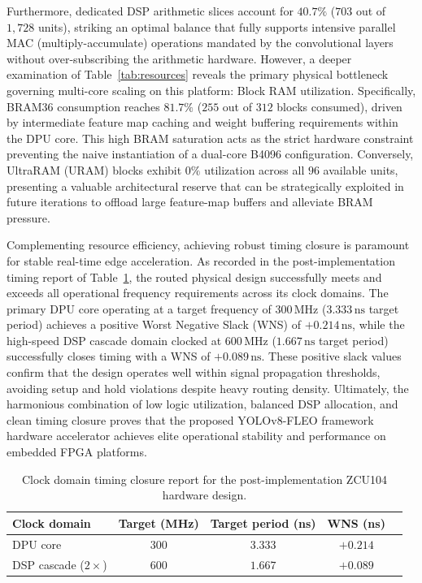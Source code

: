 \documentclass[algorithms,article,submit,moreauthors]{Definitions/mdpi}
\begin{document}
Furthermore, dedicated DSP arithmetic slices account for $40.7\%$ ($703$ out of $1{,}728$ units), striking an optimal balance that fully supports intensive parallel MAC (multiply-accumulate) operations mandated by the convolutional layers without over-subscribing the arithmetic hardware. However, a deeper examination of Table~\ref{tab:resources} reveals the primary physical bottleneck governing multi-core scaling on this platform: Block RAM utilization. Specifically, BRAM36 consumption reaches $81.7\%$ ($255$ out of $312$ blocks consumed), driven by intermediate feature map caching and weight buffering requirements within the DPU core. This high BRAM saturation acts as the strict hardware constraint preventing the naive instantiation of a dual-core B4096 configuration. Conversely, UltraRAM (URAM) blocks exhibit $0\%$ utilization across all $96$ available units, presenting a valuable architectural reserve that can be strategically exploited in future iterations to offload large feature-map buffers and alleviate BRAM pressure.

Complementing resource efficiency, achieving robust timing closure is paramount for stable real-time edge acceleration. As recorded in the post-implementation timing report of Table~\ref{tab:timing}, the routed physical design successfully meets and exceeds all operational frequency requirements across its clock domains. The primary DPU core operating at a target frequency of $300\,\text{MHz}$ ($3.333\,\text{ns}$ target period) achieves a positive Worst Negative Slack (WNS) of $+0.214\,\text{ns}$, while the high-speed DSP cascade domain clocked at $600\,\text{MHz}$ ($1.667\,\text{ns}$ target period) successfully closes timing with a WNS of $+0.089\,\text{ns}$. These positive slack values confirm that the design operates well within signal propagation thresholds, avoiding setup and hold violations despite heavy routing density. Ultimately, the harmonious combination of low logic utilization, balanced DSP allocation, and clean timing closure proves that the proposed YOLOv8-FLEO framework hardware accelerator achieves elite operational stability and performance on embedded FPGA platforms.

\begin{table}[ h!]
\centering
\caption{Clock domain timing closure report for the post-implementation ZCU104 hardware design.}
\label{tab:timing}
\setlength{\tabcolsep}{6pt}\renewcommand{\arraystretch}{1.2}
\begin{tabular}{lcccc}
\toprule
Clock domain & Target (MHz) & Target period (ns) & WNS (ns) \\
\midrule
DPU core        & $300$ & $3.333$ & $+0.214$ \\
DSP cascade ($2\times$) & $600$ & $1.667$ & $+0.089$ \\
\bottomrule
\end{tabular}
\end{table}
\end{document}
